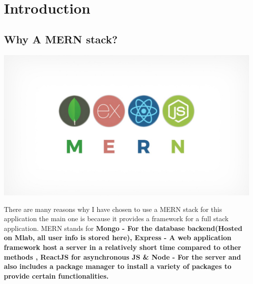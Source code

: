 \chapter{Introduction}
\section {Why A MERN stack?}
\begin{center}
\includegraphics[width=\textwidth]{img/mern.jpeg}
\end{center}
There are many reasons why I have chosen to use a MERN stack for this
application the main one is because it provides a framework for a full stack
application.
MERN stands for \textbf{Mongo - For the database backend(Hosted on Mlab, all user info is stored here),
Express - A web application framework
host a server in a relatively short time compared to other methods
, ReactJS for asynchronous JS \& Node - For the server and also includes a package manager to install a variety of packages to provide certain functionalities.}
\cite{MERN}
\\
